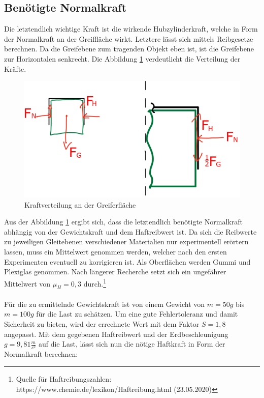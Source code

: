 \subsection{Benötigte Normalkraft}
Die letztendlich wichtige Kraft ist die wirkende Hubzylinderkraft, welche in Form der Normalkraft an der Greiffläche wirkt. Letztere lässt sich mittels Reibgesetze berechnen. Da die Greifebene zum tragenden Objekt eben ist, ist die Greifebene zur Horizontalen senkrecht. Die Abbildung \ref{greiferfläche} verdeutlicht die Verteilung der Kräfte.
\begin{figure}[h]
	\begin{center}
	\includegraphics[scale=0.6]{"Grafiken/Greiferflaeche.png"}
	\caption{Kraftverteilung an der Greiferfläche}
	\label{greiferfläche}
	\end{center}
\end{figure}
\newpage
Aus der Abbildung \ref{greiferfläche} ergibt sich, dass die letztendlich benötigte Normalkraft abhängig von der Gewichtskraft und dem Haftreibwert ist. Da sich die Reibwerte zu jeweiligen Gleitebenen verschiedener Materialien nur experimentell erörtern lassen, muss ein Mittelwert genommen werden, welcher nach den ersten Experimenten eventuell zu korrigieren ist. Als Oberflächen werden Gummi und Plexiglas genommen. Nach längerer Recherche setzt sich ein ungefährer Mittelwert von $\mu_H = 0,3$ durch.\footnote[1]{Quelle für Haftreibungszahlen: https://www.chemie.de/lexikon/Haftreibung.html (23.05.2020)}\\
\\
Für die zu ermittelnde Gewichtskraft ist von einem Gewicht von $m=50g$ bis $m=100 g$ für die Last zu schätzen. Um eine gute Fehlertoleranz und damit Sicherheit zu bieten, wird der errechnete Wert mit dem Faktor $S = 1,8$ angepasst.
Mit dem gegebenen Haftreibwert und der Erdbeschleunigung $g = 9,81 \frac{m}{s^2}$ auf die Last, lässt sich nun die nötige Haftkraft in Form der Normalkraft berechnen:

